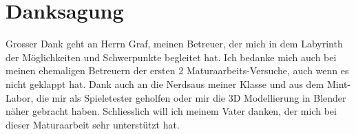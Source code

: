 \section{Danksagung}
Grosser Dank geht an Herrn Graf, meinen Betreuer, der mich in dem Labyrinth der Möglichkeiten und Schwerpunkte begleitet hat.
Ich bedanke mich auch bei meinen ehemaligen Betreuern der ersten 2 Maturaarbeits-Versuche, auch wenn es nicht geklappt hat.
Dank auch an die \glqq Nerds\grqq aus meiner Klasse und aus dem Mint-Labor, die mir als Spieletester geholfen oder mir die 3D Modellierung in Blender näher gebracht haben.
Schliesslich will ich meinem Vater danken, der mich bei dieser Maturaarbeit sehr unterstützt hat.